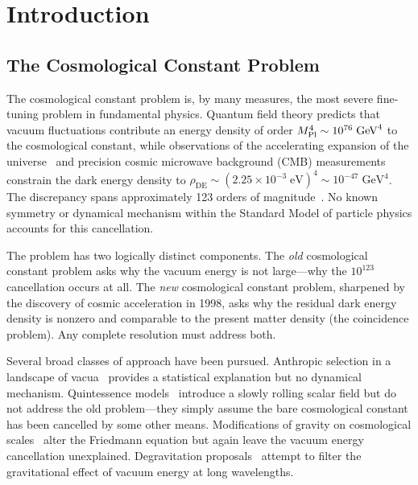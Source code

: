 \section{Introduction}
\label{sec:1-intro}

\subsection{The Cosmological Constant Problem}
\label{sec:1-cc-problem}

The cosmological constant problem is, by many measures, the most severe fine-tuning problem in fundamental physics. Quantum field theory predicts that vacuum fluctuations contribute an energy density of order $M_{\mathrm{Pl}}^4 \sim 10^{76}\;\mathrm{GeV}^4$ to the cosmological constant, while observations of the accelerating expansion of the universe~\cite{ch1:riess98,ch1:perlmutter99} and precision cosmic microwave background (CMB) measurements~\cite{ch1:planck18} constrain the dark energy density to $\rho_{\mathrm{DE}} \sim (2.25 \times 10^{-3}\;\mathrm{eV})^4 \sim 10^{-47}\;\mathrm{GeV}^4$. The discrepancy spans approximately 123 orders of magnitude~\cite{ch1:weinberg89,ch1:martin12}. No known symmetry or dynamical mechanism within the Standard Model of particle physics accounts for this cancellation.

The problem has two logically distinct components. The \emph{old} cosmological constant problem asks why the vacuum energy is not large---why the $10^{123}$ cancellation occurs at all. The \emph{new} cosmological constant problem, sharpened by the discovery of cosmic acceleration in 1998, asks why the residual dark energy density is nonzero and comparable to the present matter density (the coincidence problem). Any complete resolution must address both.

Several broad classes of approach have been pursued. Anthropic selection in a landscape of vacua~\cite{ch1:weinberg87} provides a statistical explanation but no dynamical mechanism. Quintessence models~\cite{ch1:ratra88,ch1:copeland06} introduce a slowly rolling scalar field but do not address the old problem---they simply assume the bare cosmological constant has been cancelled by some other means. Modifications of gravity on cosmological scales~\cite{ch1:clifton12,ch1:nojiri17} alter the Friedmann equation but again leave the vacuum energy cancellation unexplained. Degravitation proposals~\cite{ch1:dvali07} attempt to filter the gravitational effect of vacuum energy at long wavelengths.

